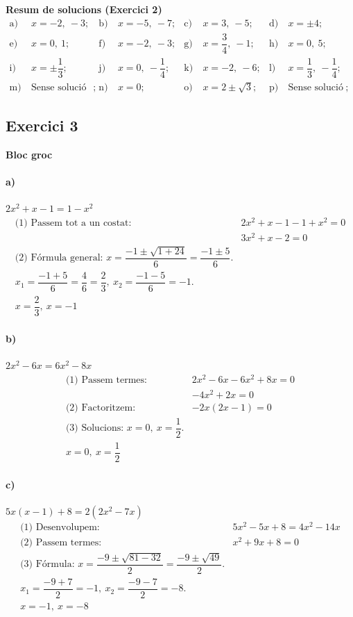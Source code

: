 \documentclass[11pt,a4paper]{article}
\begin{document}
\textbf{Resum de solucions (Exercici 2)}
\[
\begin{aligned}
\text{a)}&\ x = -2,\ -3; &
\text{b)}&\ x = -5,\ -7; &
\text{c)}&\ x = 3,\ -5; &
\text{d)}&\ x = \pm 4; \\
\text{e)}&\ x = 0,\ 1; &
\text{f)}&\ x = -2,\ -3; &
\text{g)}&\ x = \dfrac{3}{4},\ -1; &
\text{h)}&\ x = 0,\ 5; \\
\text{i)}&\ x = \pm \dfrac{1}{3}; &
\text{j)}&\ x = 0,\ -\dfrac{1}{4}; &
\text{k)}&\ x = -2,\ -6; &
\text{l)}&\ x = \dfrac{1}{3},\ -\dfrac{1}{4}; \\
\text{m)}&\ \text{Sense solució real}; &
\text{n)}&\ x = 0; &
\text{o)}&\ x = 2 \pm \sqrt{3}; &
\text{p)}&\ \text{Sense solució real}; &
\end{aligned}
\]

\subsection*{Exercici 3}
\textbf{Bloc groc}

\paragraph{a)} $2x^2 + x - 1 = 1 - x^2$
\[
\begin{aligned}
\text{(1) Passem tot a un costat: } & 2x^2 + x - 1 - 1 + x^2 = 0 \\
& 3x^2 + x - 2 = 0 \\
\text{(2) Fórmula general: } x=\dfrac{-1\pm\sqrt{1+24}}{6}=\dfrac{-1\pm5}{6}. \\
x_1=\dfrac{-1+5}{6}=\dfrac{4}{6}=\dfrac{2}{3},\ x_2=\dfrac{-1-5}{6}=-1. \\
\boxed{x=\dfrac{2}{3},\ x=-1}
\end{aligned}
\]

\paragraph{b)} $2x^2 - 6x = 6x^2 - 8x$
\[
\begin{aligned}
\text{(1) Passem termes: } & 2x^2 - 6x - 6x^2 + 8x = 0 \\
& -4x^2 + 2x = 0 \\
\text{(2) Factoritzem: } & -2x(2x - 1)=0 \\
\text{(3) Solucions: } x=0,\ x=\dfrac{1}{2}. \\
\boxed{x=0,\ x=\dfrac{1}{2}}
\end{aligned}
\]

\paragraph{c)} $5x(x - 1) + 8 = 2(2x^2 - 7x)$
\[
\begin{aligned}
\text{(1) Desenvolupem: } & 5x^2 - 5x + 8 = 4x^2 - 14x \\
\text{(2) Passem termes: } & x^2 + 9x + 8 = 0 \\
\text{(3) Fórmula: } x=\dfrac{-9\pm\sqrt{81-32}}{2}=\dfrac{-9\pm\sqrt{49}}{2}. \\
x_1=\dfrac{-9+7}{2}=-1,\ x_2=\dfrac{-9-7}{2}=-8. \\
\boxed{x=-1,\ x=-8}
\end{aligned}
\]
\end{document}
